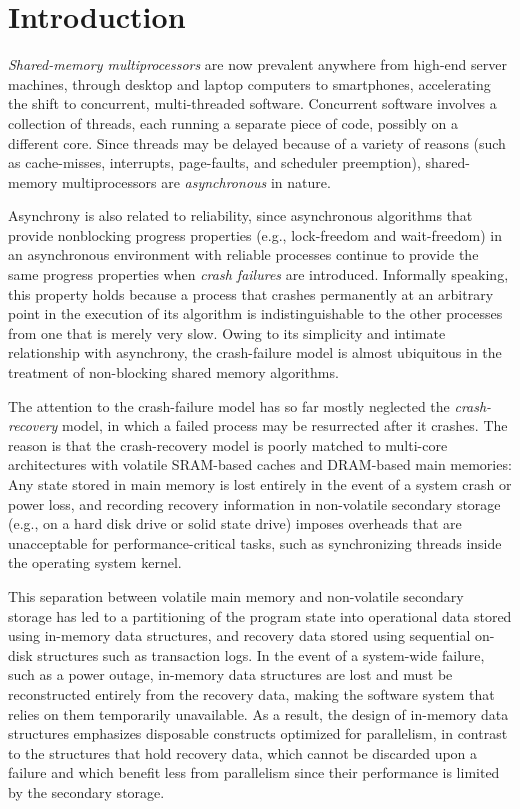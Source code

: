 
\section{Introduction}

\emph{Shared-memory multiprocessors} are now prevalent anywhere from high-end server machines, through desktop and laptop computers to smartphones, accelerating the shift to concurrent, multi-threaded software.
Concurrent software involves a collection of threads, each running a separate piece of code, possibly on a different core. Since threads may be delayed because of a variety of reasons (such as cache-misses, interrupts, page-faults, and scheduler preemption),
shared-memory multiprocessors are \emph{asynchronous} in nature.

Asynchrony is also related to reliability, since asynchronous algorithms that provide nonblocking progress properties (e.g., lock-freedom and wait-freedom) in an asynchronous environment with reliable processes continue to provide the same progress properties when \emph{crash failures} are introduced.
Informally speaking, this property holds because a process that crashes permanently at an arbitrary point in the execution of its algorithm is indistinguishable to the other processes from one that is merely very slow. Owing to its simplicity and intimate relationship with asynchrony, the crash-failure model is almost ubiquitous in the treatment of non-blocking shared memory algorithms.

The attention to the crash-failure model has so far mostly neglected the \emph{crash-recovery} model, in which a failed process may be resurrected after it crashes. The reason is that the crash-recovery model is poorly matched to multi-core
architectures with volatile SRAM-based caches and DRAM-based main memories: Any state stored in main memory is lost entirely in the event of a system crash or power loss, and recording recovery information in non-volatile secondary storage (e.g., on a hard disk drive or solid state drive) imposes overheads that are unacceptable for performance-critical tasks, such as synchronizing threads inside the operating system kernel.

This separation between volatile main memory and non-volatile secondary storage has led to a partitioning of the program state into operational data stored using in-memory data structures, and recovery data stored using sequential on-disk structures such as transaction logs.
In the event of a system-wide failure, such as a power outage, in-memory data structures are lost and must be reconstructed entirely from the recovery data, making the software system that relies on them temporarily unavailable. As a result, the design of in-memory data structures emphasizes disposable constructs optimized for parallelism, in contrast to the structures that hold recovery data, which cannot be discarded upon a failure and which benefit less from parallelism since their performance is limited by the secondary storage.

